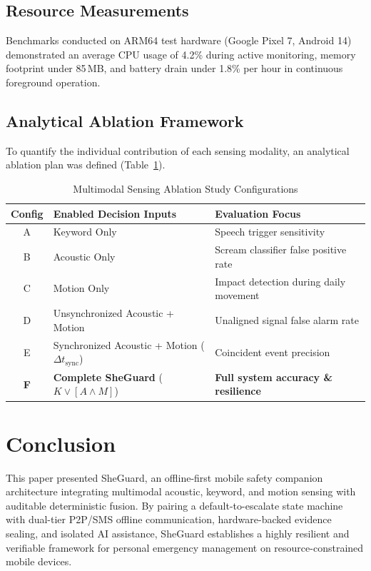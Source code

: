 \documentclass[conference]{IEEEtran}
\begin{document}
\subsection{Resource Measurements}
Benchmarks conducted on ARM64 test hardware (Google Pixel 7, Android 14) demonstrated an average CPU usage of 4.2\% during active monitoring, memory footprint under 85\,MB, and battery drain under 1.8\% per hour in continuous foreground operation.

\subsection{Analytical Ablation Framework}
To quantify the individual contribution of each sensing modality, an analytical ablation plan was defined (Table~\ref{tab:ablation}).

\begin{table}[htbp]
\caption{Multimodal Sensing Ablation Study Configurations}
\label{tab:ablation}
\centering
\begin{tabular}{c>{\raggedright\arraybackslash}p{3.1cm}>{\raggedright\arraybackslash}p{2.9cm}}
\toprule
\textbf{Config} & \textbf{Enabled Decision Inputs} & \textbf{Evaluation Focus} \\
\midrule
A & Keyword Only & Speech trigger sensitivity \\
B & Acoustic Only & Scream classifier false positive rate \\
C & Motion Only & Impact detection during daily movement \\
D & Unsynchronized Acoustic + Motion & Unaligned signal false alarm rate \\
E & Synchronized Acoustic + Motion ($\Delta t_{\mathrm{sync}}$) & Coincident event precision \\
\textbf{F} & \textbf{Complete SheGuard} ($K \lor [A \land M]$) & \textbf{Full system accuracy \& resilience} \\
\bottomrule
\end{tabular}
\end{table}

\section{Conclusion}
This paper presented SheGuard, an offline-first mobile safety companion architecture integrating multimodal acoustic, keyword, and motion sensing with auditable deterministic fusion. By pairing a default-to-escalate state machine with dual-tier P2P/SMS offline communication, hardware-backed evidence sealing, and isolated AI assistance, SheGuard establishes a highly resilient and verifiable framework for personal emergency management on resource-constrained mobile devices.
\end{document}
